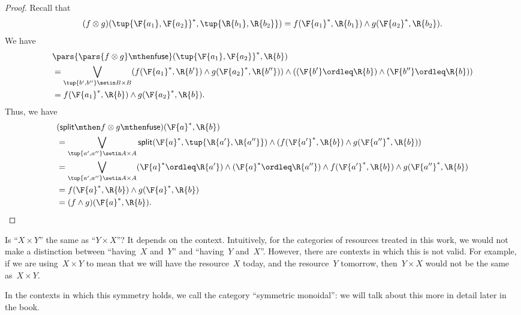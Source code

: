 \begin{proof}
    Recall that
    \begin{equation}
        (f\otimes g)(\tup{\F{a_1},\F{a_2}}^*, \tup{\R{b_1},\R{b_2}})
        =f(\F{a_1}^*,\R{b_1})\wedge g(\F{a_2}^*,\R{b_2}).
    \end{equation}
    We have
    \begin{equation}
        \begin{aligned}
             & \pars{\pars{f\otimes g} \mthen \mathsf{fuse}}(\tup{\F{a_1},\F{a_2}}^*,\R{b}) \\
             & =\bigvee_{\tup{b',b''}\setin B\times B}(f(\F{a_1}^*,\R{b'})\wedge g(\F{a_2}^*,\R{b''}))\wedge ((\F{b'}\ordleq \R{b}) \wedge (\F{b''}\ordleq \R{b})) \\
             & =f(\F{a_1}^*,\R{b})\wedge g(\F{a_2}^*,\R{b}).
        \end{aligned}
    \end{equation}
    Thus, we have
    \begin{equation}
        \begin{aligned}
             & (\mathsf{split}\mthen f\otimes g\mthen \mathsf{fuse})(\F{a}^*,\R{b}) \\&=\bigvee_{\tup{a',a''}\setin A\times A} \mathsf{split}(\F{a}^*, \tup{\R{a'},\R{a''}})\wedge (f(\F{a'}^*,\R{b})\wedge g(\F{a''}^*,\R{b}))\\
             & =\bigvee_{\tup{a',a''}\setin A\times A}(\F{a}^*\ordleq \R{a'})\wedge (\F{a}^*\ordleq \R{a''})\wedge f(\F{a'}^*,\R{b})\wedge g(\F{a''}^*,\R{b}) \\
             & =f(\F{a}^*,\R{b})\wedge g(\F{a}^*,\R{b}) \\
             & =(f\wedge g)(\F{a}^*,\R{b}).
        \end{aligned}
    \end{equation}
\end{proof}

Is ``$X \times Y$'' the same as ``$Y \times X$''?
It depends on the context.
Intuitively, for the categories of resources treated in this work, we would not make a distinction between ``having~$X$ and~$Y$'' and ``having~$Y$ and~$X$''.
However, there are contexts in which this is not valid.
For example, if we are using~$X \times Y$ to mean that we will have the resource~$X$ today, and the resource~$Y$ tomorrow, then~$Y \times X$ would not be the same as~$X \times Y$.

In the contexts in which this symmetry holds, we call the category ``symmetric monoidal'': we will talk about this more in detail later in the book.

